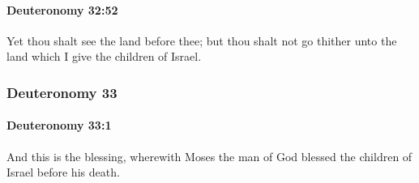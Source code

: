 		\paragraph{Deuteronomy 32:52} %
			\label{DEUTERONOMY-32-52}

			Yet thou shalt see the land before thee; but thou shalt not go thither unto the land which I give the children of Israel.

	\subsubsection{Deuteronomy 33} %
		\label{DEUTERONOMY-33}

		\paragraph{Deuteronomy 33:1} %
			\label{DEUTERONOMY-33-1}

			And this is the blessing, wherewith Moses the man of God blessed the children of Israel before his death.


